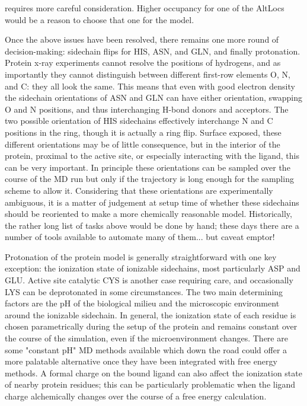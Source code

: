 \documentclass[9pt,bestpractices]{livecoms}
\begin{document}
requires more careful consideration. Higher occupancy for one of the AltLocs would be a reason to choose that one for the model.

Once the above issues have been resolved, there remains one more round of decision-making: sidechain flips for HIS, ASN, and GLN, and finally protonation. Protein x-ray experiments cannot resolve the positions of hydrogens, and as importantly they cannot distinguish between different first-row elements O, N, and C: they all look the same. This means that even with good electron density the sidechain orientations of ASN and GLN can have either orientation, swapping O and N positions, and thus interchanging H-bond donors and acceptors. The two possible orientation of HIS sidechains effectively interchange N and C positions in the ring, though it is actually a ring flip. Surface exposed, these different orientations may be of little consequence, but in the interior of the protein, proximal to the active site, or especially interacting with the ligand, this can be very important. In principle these orientations can be sampled over the course of the MD run but only if the trajectory is long enough for the sampling scheme to allow it. Considering that these orientations are experimentally ambiguous, it is a matter of judgement at setup time of whether these sidechains should be reoriented to make a more chemically reasonable model. Historically, the rather long list of tasks above would be done by hand; these days there are a number of tools available to automate many of them... but caveat emptor!

Protonation of the protein model is generally straightforward with one key exception: the ionization state of ionizable sidechains, most particularly ASP and GLU. Active site catalytic CYS is another case requiring care, and occasionally LYS can be deprotonated in some circumstances. The two main determining factors are the pH of the biological milieu and the microscopic environment around the ionizable sidechain. In general, the ionization state of each residue is chosen parametrically during the setup of the protein and remains constant over the course of the simulation, even if the microenvironment changes. There are some "constant pH" MD methods available which down the road could offer a more palatable alternative once they have been integrated with free energy methods. A formal charge on the bound ligand can also affect the ionization state of nearby protein residues; this can be particularly problematic when the ligand charge alchemically changes over the course of a free energy calculation.
\end{document}

